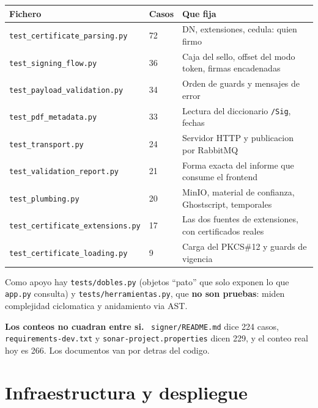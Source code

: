 \documentclass[11pt,a4paper,oneside]{report}
\newenvironment{nota}[1][Nota]{%
  \par\medskip
  \colorlet{shadecolor}{black!6}%
  \begin{shaded}\noindent\textbf{#1.}\ \ignorespaces}%
  {\end{shaded}\par\medskip}
\newcommand{\rt}[1]{\texttt{#1}}
\begin{document}
\begin{center}
\footnotesize
\begin{tabularx}{\textwidth}{@{}P{5.4cm}P{1.4cm}L@{}}
\toprule
\textbf{Fichero} & \textbf{Casos} & \textbf{Que fija} \\
\midrule
\rt{test\_certificate\_parsing.py}    & 72 & DN, extensiones, cedula: quien firmo \\
\rt{test\_signing\_flow.py}           & 36 & Caja del sello, offset del modo token, firmas encadenadas \\
\rt{test\_payload\_validation.py}     & 34 & Orden de guards y mensajes de error \\
\rt{test\_pdf\_metadata.py}           & 33 & Lectura del diccionario \rt{/Sig}, fechas \\
\rt{test\_transport.py}               & 24 & Servidor HTTP y publicacion por RabbitMQ \\
\rt{test\_validation\_report.py}      & 21 & Forma exacta del informe que consume el frontend \\
\rt{test\_plumbing.py}                & 20 & MinIO, material de confianza, Ghostscript, temporales \\
\rt{test\_certificate\_extensions.py} & 17 & Las dos fuentes de extensiones, con certificados reales \\
\rt{test\_certificate\_loading.py}    & 9  & Carga del PKCS\#12 y guards de vigencia \\
\bottomrule
\end{tabularx}
\end{center}

Como apoyo hay \rt{tests/dobles.py} (objetos ``pato'' que solo exponen lo que \rt{app.py}
consulta) y \rt{tests/herramientas.py}, que \textbf{no son pruebas}: miden complejidad
ciclomatica y anidamiento via AST.

\begin{nota}[Los conteos no cuadran entre si]
\rt{signer/README.md} dice 224 casos, \rt{requirements-dev.txt} y \rt{sonar-project.properties}
dicen 229, y el conteo real hoy es 266. Los documentos van por detras del codigo.
\end{nota}

\chapter{Infraestructura y despliegue}
\end{document}
